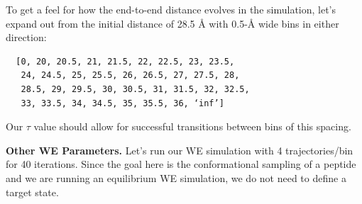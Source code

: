 To get a feel for how the end-to-end distance evolves in the simulation, let’s expand out from the initial distance of 28.5 \AA{} with 0.5-\AA{} wide bins in either direction:
\begin{verbatim}
  [0, 20, 20.5, 21, 21.5, 22, 22.5, 23, 23.5,
   24, 24.5, 25, 25.5, 26, 26.5, 27, 27.5, 28,
   28.5, 29, 29.5, 30, 30.5, 31, 31.5, 32, 32.5,
   33, 33.5, 34, 34.5, 35, 35.5, 36, ‘inf’]
\end{verbatim}
Our $\tau$ value should allow for successful transitions between bins of this spacing.

\textbf{Other WE Parameters.} Let’s run our WE simulation with 4 trajectories/bin for 40 iterations. 
Since the goal here is the conformational sampling of a peptide and we are running an equilibrium WE simulation, we do not need to define a target state.

